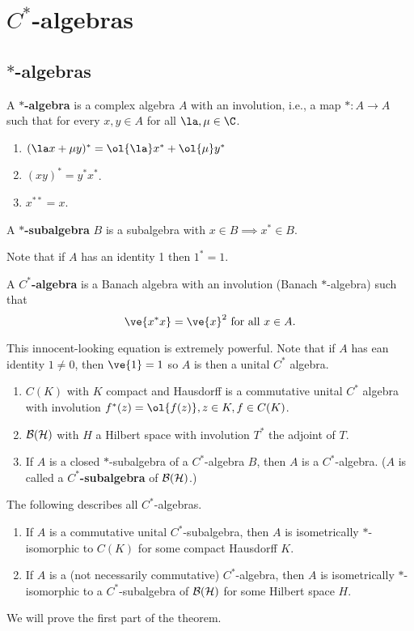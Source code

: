 \chapter{$C^*$-algebras}
\section{$*$-algebras}
\begin{df}
A \textbf{$*$-algebra} is a complex algebra $A$ with an involution, i.e., a map $*:A\to A$ such that for every $x,y\in A$ for all $\la,\mu\in \C$. 
\begin{enumerate}
\item
$(\la x+\mu y)^*=\ol{\la}x^*+\ol{\mu}y^*$
\item
$(xy)^*=y^*x^*$. 
\item
$x^{**}=x$.
\end{enumerate}
A \textbf{$*$-subalgebra} $B$ is a subalgebra with $x\in B\implies x^*\in B$.
\end{df}
Note that if $A$ has an identity 1 then $1^*=1$. 
\begin{df}
A \textbf{$C^*$-algebra} is a Banach algebra with an involution (Banach $*$-algebra) such that
\[
\ve{x^*x}=\ve{x}^2\text{ for all }x\in A.
\]
\end{df}
This innocent-looking equation is extremely powerful. Note that if $A$ has ean identity $1\ne 0$, then $\ve{1}=1$ so $A$ is then a unital $C^*$ algebra. 
\begin{ex}
\begin{enumerate}
\item
$C(K)$ with $K$ compact and Hausdorff is a commutative unital $C^*$ algebra with involution $f^*(z)=\ol{f(z)}, z\in K, f\in C(K)$. 
\item
$\cal B(H)$ with $H$ a Hilbert space with involution $T^*$ the adjoint of $T$. 
\item
If $A$ is a closed $*$-subalgebra of a $C^*$-algebra $B$, then $A$ is a $C^*$-algebra. ($A$ is called a \textbf{$C^*$-subalgebra} of $\cal B(H)$.)
\end{enumerate}
\end{ex}
The following describes all $C^*$-algebras.
\begin{thm}
\begin{enumerate}
\item
If $A$ is a commutative unital $C^*$-subalgebra, then $A$ is isometrically $*$-isomorphic to $C(K)$ for some compact Hausdorff $K$.
\item
If $A$ is a (not necessarily commutative) $C^*$-algebra, then $A$ is isometrically $*$-isomorphic to a $C^*$-subalgebra of $\cal B(H)$ for some Hilbert space $H$.
\end{enumerate}
\end{thm}
We will prove the first part of the theorem.

